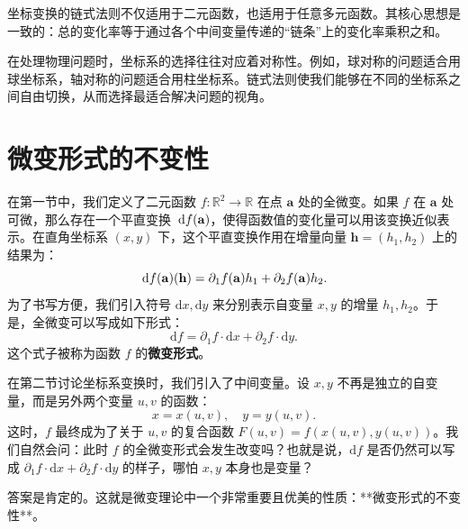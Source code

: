 \documentclass[12pt,UTF8]{ctexbook}
\begin{document}
坐标变换的链式法则不仅适用于二元函数，也适用于任意多元函数。其核心思想是一致的：总的变化率等于通过各个中间变量传递的“链条”上的变化率乘积之和。

在处理物理问题时，坐标系的选择往往对应着对称性。例如，球对称的问题适合用球坐标系，轴对称的问题适合用柱坐标系。链式法则使我们能够在不同的坐标系之间自由切换，从而选择最适合解决问题的视角。

\section{微变形式的不变性}

在第一节中，我们定义了二元函数 $f: \mathbb{R}^2 \to \mathbb{R}$ 在点 $\mathbf{a}$ 处的全微变。如果 $f$ 在 $\mathbf{a}$ 处可微，那么存在一个平直变换 $\,\mathrm{d} f(\mathbf{a})$，使得函数值的变化量可以用该变换近似表示。在直角坐标系 $(x, y)$ 下，这个平直变换作用在增量向量 $\mathbf{h} = (h_1, h_2)$ 上的结果为：
$$ \,\mathrm{d} f(\mathbf{a})(\mathbf{h}) = \partial_1 f(\mathbf{a}) h_1 + \partial_2 f(\mathbf{a}) h_2. $$
为了书写方便，我们引入符号 $\mathrm{d}x, \mathrm{d}y$ 来分别表示自变量 $x, y$ 的增量 $h_1, h_2$。于是，全微变可以写成如下形式：
$$ \mathrm{d}f = \partial_1 f \cdot \mathrm{d}x + \partial_2 f \cdot \mathrm{d}y. $$
这个式子被称为函数 $f$ 的\textbf{微变形式}。

在第二节讨论坐标系变换时，我们引入了中间变量。设 $x, y$ 不再是独立的自变量，而是另外两个变量 $u, v$ 的函数：
$$ x = x(u, v), \quad y = y(u, v). $$
这时，$f$ 最终成为了关于 $u, v$ 的复合函数 $F(u, v) = f(x(u, v), y(u, v))$。我们自然会问：此时 $f$ 的全微变形式会发生改变吗？也就是说，$\mathrm{d}f$ 是否仍然可以写成 $\partial_1 f \cdot \mathrm{d}x + \partial_2 f \cdot \mathrm{d}y$ 的样子，哪怕 $x, y$ 本身也是变量？

答案是肯定的。这就是微变理论中一个非常重要且优美的性质：**微变形式的不变性**。
\end{document}

